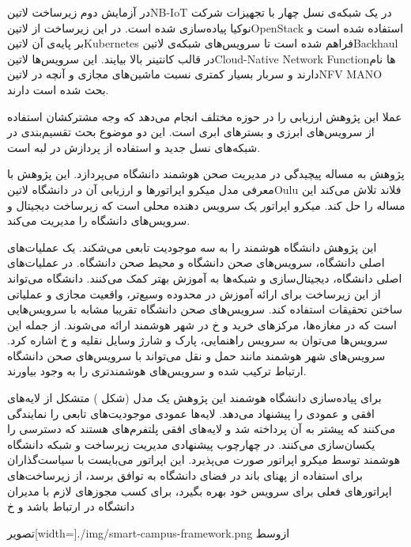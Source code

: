 در آزمایش دوم زیرساخت ‌لاتین{NB-IoT} در یک شبکه‌ی نسل چهار با تجهیزات شرکت نوکیا پیاده‌سازی شده است.
در این زیرساخت از ‌لاتین{OpenStack} استفاده شده است و بر پایه‌ی آن ‌لاتین{Kubernetes} فراهم شده است
تا سرویس‌های شبکه‌ی ‌لاتین{Backhaul} در قالب کانتینر بالا بیایند.
این سرویس‌ها ‌لاتین{Cloud-Native Network Function}ها نام دارند و سربار بسیار کمتری نسبت ماشین‌های مجازی
و آنچه در ‌لاتین{NFV MANO} بحث شده است دارند.

عملا این پژوهش ارزیابی را در حوزه مختلف انجام می‌دهد که وجه مشترکشان استفاده از سرویس‌های ابرزی و بسترهای ابری است.
این دو موضوع بحث تقسیم‌بندی در شبکه‌های نسل جدید و استفاده از پردازش در لبه است.


پژوهش  به مساله پیچیدگی در مدیریت صحن هوشمند دانشگاه می‌پردازد. این پژوهش با معرفی مدل میکرو اپراتورها و ارزیابی آن در دانشگاه ‌لاتین{Oulu} فلاند تلاش می‌کند این مساله را حل کند.
میکرو اپراتور یک سرویس دهنده محلی است که زیرساخت دیجیتال و سرویس‌های دانشگاه را مدیریت می‌کند.

این پژوهش دانشگاه هوشمند را به سه موجودیت تابعی می‌شکند. یک عملیات‌های اصلی دانشگاه، سرویس‌های صحن دانشگاه و محیط صحن دانشگاه.
در عملیات‌های اصلی دانشگاه، دیجیتال‌سازی و شبکه‌ها به آموزش بهتر کمک می‌کنند. دانشگاه می‌تواند از این زیرساخت برای ارائه آموزش در محدوده وسیع‌تر، واقعیت مجازی و عملیاتی ساختن تحقیقات استفاده کند.
سرویس‌های صحن دانشگاه تقریبا مشابه با سرویس‌هایی است که در مغازه‌ها، مرکزهای خرید و ‌خ در شهر هوشمند ارائه می‌شوند. از جمله این سرویس‌ها می‌توان به سرویس راهنمایی، پارک و شارژ وسایل نقلیه و ‌خ اشاره کرد.
سرویس‌های شهر هوشمند مانند حمل و نقل می‌تواند با سرویس‌های صحن دانشگاه ارتباط ترکیب شده و سرویس‌های هوشمند‌تری را به وجود بیاورند.

برای پیاده‌سازی دانشگاه هوشمند این پژوهش یک مدل (شکل ) متشکل از لایه‌های افقی و عمودی را پیشنهاد می‌دهد. لایه‌ها عمودی موجودیت‌های تابعی را نمایندگی می‌کنند که پیشتر به آن پرداخته شد و لایه‌های
افقی پلتفرم‌های هستند که دسترسی را یکسان‌سازی می‌کنند. در چهارچوب پیشنهادی مدیریت زیرساخت و شبکه دانشگاه هوشمند توسط میکرو اپراتور صورت می‌پذیرد. این اپراتور می‌بایست با سیاست‌گذاران برای استفاده از پهنای باند در فضای دانشگاه
به توافق برسد، از زیرساخت‌های اپراتورهای فعلی برای سرویس خود بهره بگیرد، برای کسب مجوزهای لازم با مدیران دانشگاه در ارتباط باشد و ‌خ

‌تصویر[width=\textwidth]{./img/smart-campus-framework.png}
‌ازوسط

